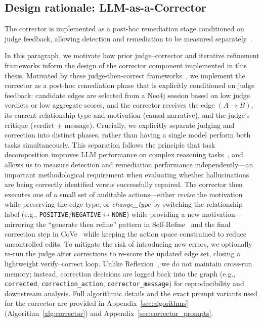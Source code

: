\subsection{Design rationale: LLM-as-a-Corrector}
The corrector is implemented as a post-hoc remediation stage conditioned on judge feedback, allowing detection and remediation to be measured separately~\citep{dhuliawala2024chain, shinn2024reflexion}.

In this paragraph, we motivate how prior judge--corrector and iterative refinement frameworks inform the design of the corrector component implemented in this thesis. Motivated by these judge-then-correct frameworks~\citep{dhuliawala2024chain, shinn2024reflexion, madaan2023selfrefineiterativerefinementselffeedback}, we implement the corrector as a post-hoc remediation phase that is explicitly conditioned on judge feedback: candidate edges are selected from a Neo4j session based on low judge verdicts or low aggregate scores, and the corrector receives the edge \((A \rightarrow B)\), its current relationship type and motivation (causal narrative), and the judge's critique (verdict + message). Crucially, we explicitly separate judging and correction into distinct phases, rather than having a single model perform both tasks simultaneously. This separation follows the principle that task decomposition improves LLM performance on complex reasoning tasks~\citep{zhou2023leasttomostpromptingenablescomplex}, and allows us to measure detection and remediation performance independently---an important methodological requirement when evaluating whether hallucinations are being correctly identified versus successfully repaired. The corrector then executes one of a small set of auditable actions---either \textit{revise} the motivation while preserving the edge type, or \textit{change\_type} by switching the relationship label (e.g., \texttt{POSITIVE}/\texttt{NEGATIVE}$\leftrightarrow$\texttt{NONE}) while providing a new motivation---mirroring the ``generate then refine'' pattern in Self-Refine~\citep{madaan2023selfrefineiterativerefinementselffeedback} and the final correction step in CoVe~\citep{dhuliawala2024chain} while keeping the action space constrained to reduce uncontrolled edits. To mitigate the risk of introducing new errors, we optionally re-run the judge after corrections to re-score the updated edge set, closing a lightweight verify--correct loop. Unlike Reflexion~\citep{shinn2024reflexion}, we do not maintain cross-run memory; instead, correction decisions are logged back into the graph (e.g., \texttt{corrected}, \texttt{correction\_action}, \texttt{corrector\_message}) for reproducibility and downstream analysis. Full algorithmic details and the exact prompt variants used for the corrector are provided in Appendix~\ref{sec:algorithms} (Algorithm~\ref{alg:corrector}) and Appendix~\ref{sec:corrector_prompts}.

